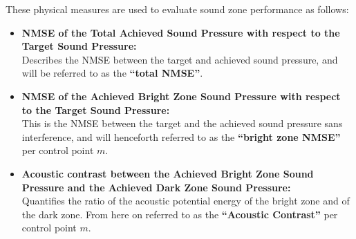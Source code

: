 These physical measures are used to evaluate sound zone performance as follows:
\begin{itemize}
    \item \textbf{NMSE of the Total Achieved Sound Pressure with respect to the Target Sound Pressure:}\\
        Describes the NMSE between the target and achieved sound pressure, and will be referred to as the 
        \textbf{``total NMSE''}.
    \item \textbf{NMSE of the Achieved Bright Zone Sound Pressure with respect to the Target Sound Pressure:}\\
        This is the NMSE between the target and the achieved sound pressure sans interference, 
        and will henceforth referred to as the \textbf{``bright zone NMSE''} per control point $m$.
    \item \textbf{Acoustic contrast between the Achieved Bright Zone Sound Pressure and the 
        Achieved Dark Zone Sound Pressure:}\\
        Quantifies the ratio of the acoustic potential energy of the bright zone and of the dark zone.
        From here on referred to as the \textbf{``Acoustic Contrast''} per control point $m$.
\end{itemize}
